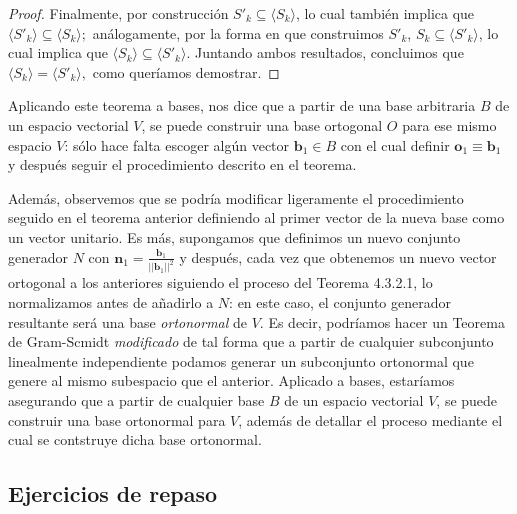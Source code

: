 \documentclass[12pt]{article}
\newenvironment{teorema}[2][Teorema]{\begin{trivlist}
\item[\hskip \labelsep {\bfseries #1}\hskip \labelsep {\bfseries #2.}]}{\end{trivlist}}
\begin{document}
\begin{teorema} {4.3.2.1 (Gram-Schmidt)}
\begin{proof}
Finalmente, por construcción $S'_k\subseteq \langle S_k \rangle$, lo cual también implica que $\langle S'_k \rangle \subseteq \langle S_k \rangle;$ análogamente, por la forma en que construimos $S'_k$, $S_k\subseteq \langle S'_k \rangle$, lo cual implica que $\langle S_k \rangle \subseteq \langle S'_k \rangle.$ Juntando ambos resultados, concluimos que $\langle S_k \rangle = \langle S'_k \rangle ,$ como queríamos demostrar.

\end{proof}
    Aplicando este teorema a bases, nos dice que a partir de una base arbitraria $B$ de un espacio vectorial $V$, se puede construir una base ortogonal $O$ para ese mismo espacio $V$: sólo hace falta escoger algún vector $\mathbf{b}_1\in B$ con el cual definir $\mathbf{o}_1\equiv\mathbf{b}_1$ y después seguir el procedimiento descrito en el teorema. 

    Además, observemos que se podría modificar ligeramente el procedimiento seguido en el teorema anterior definiendo al primer vector de la nueva base como un vector unitario. Es más, supongamos que definimos un nuevo conjunto generador $N$ con $\mathbf{n}_1=\frac{\mathbf{b}_1}{||\mathbf{b}_1||^2}$ y después, cada vez que obtenemos un nuevo vector ortogonal a los anteriores siguiendo el proceso del Teorema 4.3.2.1, lo normalizamos antes de añadirlo a $N$: en este caso, el conjunto generador resultante será una base \emph{ortonormal} de $V$. Es decir, podríamos hacer un Teorema de Gram-Scmidt \emph{modificado} de tal forma que a partir de cualquier subconjunto linealmente independiente podamos generar un subconjunto ortonormal que genere al mismo subespacio que el anterior. Aplicado a bases, estaríamos asegurando que a partir de cualquier base $B$ de un espacio vectorial $V$, se puede construir una base ortonormal para $V$, además de detallar el proceso mediante el cual se contstruye dicha base ortonormal.  

\end{teorema}


\subsection{Ejercicios de repaso}
\end{document}

